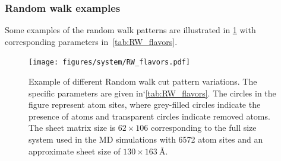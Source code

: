 \subsubsection{Random walk examples}
Some examples of the random walk patterns are illustrated in \cref{fig:RW_flavors} with corresponding parameters in~\cref{tab:RW_flavors}.

\begin{figure}[!htb]
  \centering
  \texttt{[image: figures/system/RW\_flavors.pdf]}
  \caption{Example of different Random walk cut pattern variations. The specific parameters are given in‘\cref{tab:RW_flavors}. The circles in the figure represent atom sites, where grey-filled circles indicate the presence of atoms and transparent circles indicate removed atoms. The sheet matrix size is $62 \times 106$ corresponding to the full size system used in the \acrshort{MD} simulations with 6572 atom sites and an approximate sheet size of $130 \times \SI{163}{\text{Å}}$.}
  \label{fig:RW_flavors}
\end{figure}

